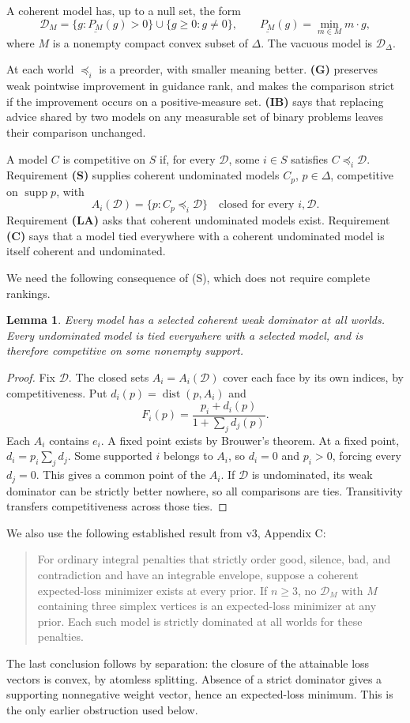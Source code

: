 \documentclass[11pt]{article}
\newtheorem{lemma}[theorem]{Lemma}
\theoremstyle{remark}\newtheorem{remark}[theorem]{Remark}
\newcommand{\Dscr}{\mathcal D}
\newcommand{\supp}{\operatorname{supp}}
\begin{document}
A coherent model has, up to a null set, the form
\[
 \Dscr_M=\{g:\underline{P_M}(g)>0\}\cup\{g\ge0:g\ne0\},
 \qquad \underline{P_M}(g)=\min_{m\in M}m\cdot g,
\]
where $M$ is a nonempty compact convex subset of $\Delta$.
The vacuous model is $\Dscr_\Delta$.

At each world $\preceq_i$ is a preorder, with smaller meaning better.
\textbf{(G)} preserves weak pointwise improvement in guidance rank, and makes
the comparison strict if the improvement occurs on a positive-measure set.
\textbf{(IB)} says that replacing advice shared by two models on any measurable
set of binary problems leaves their comparison unchanged.

A model $C$ is competitive on $S$ if, for every $\Dscr$, some $i\in S$
satisfies $C\preceq_i\Dscr$. Requirement \textbf{(S)} supplies coherent
undominated models $C_p$, $p\in\Delta$, competitive on $\supp p$, with
\[
 A_i(\Dscr)=\{p:C_p\preceq_i\Dscr\}\quad\text{closed for every }i,\Dscr.
 \tag{S}
\]
Requirement \textbf{(LA)} asks that coherent undominated models exist.
Requirement \textbf{(C)} says that a model tied everywhere with a coherent
undominated model is itself coherent and undominated.

We need the following consequence of (S), which does not require complete
rankings.
\begin{lemma}\label{lem:dominator}
Every model has a selected coherent weak dominator at all worlds. Every
undominated model is tied everywhere with a selected model, and is therefore
competitive on some nonempty support.
\end{lemma}
\begin{proof}
Fix $\Dscr$. The closed sets $A_i=A_i(\Dscr)$ cover each face by its own
indices, by competitiveness. Put $d_i(p)=\operatorname{dist}(p,A_i)$ and
\[
 F_i(p)=\frac{p_i+d_i(p)}{1+\sum_jd_j(p)}.
\]
Each $A_i$ contains $e_i$. A fixed point exists by Brouwer's theorem.
At a fixed point, $d_i=p_i\sum_jd_j$. Some supported $i$ belongs to $A_i$,
so $d_i=0$ and $p_i>0$, forcing every $d_j=0$. This gives a common point of
the $A_i$. If $\Dscr$ is undominated, its weak dominator can be strictly
better nowhere, so all comparisons are ties. Transitivity transfers
competitiveness across those ties.
\end{proof}

We also use the following established result from v3, Appendix C:
\begin{quote}
For ordinary integral penalties that strictly order good, silence, bad,
and contradiction and have an integrable envelope, suppose a coherent
expected-loss minimizer exists at every prior. If $n\ge3$, no
$\Dscr_M$ with $M$ containing three simplex vertices is an expected-loss
minimizer at any prior. Each such model is strictly dominated at all worlds
for these penalties.
\end{quote}
The last conclusion follows by separation: the closure of the attainable
loss vectors is convex, by atomless splitting. Absence of a strict
dominator gives a supporting nonnegative weight vector, hence an
expected-loss minimum. This is the only earlier obstruction used below.
\end{document}
